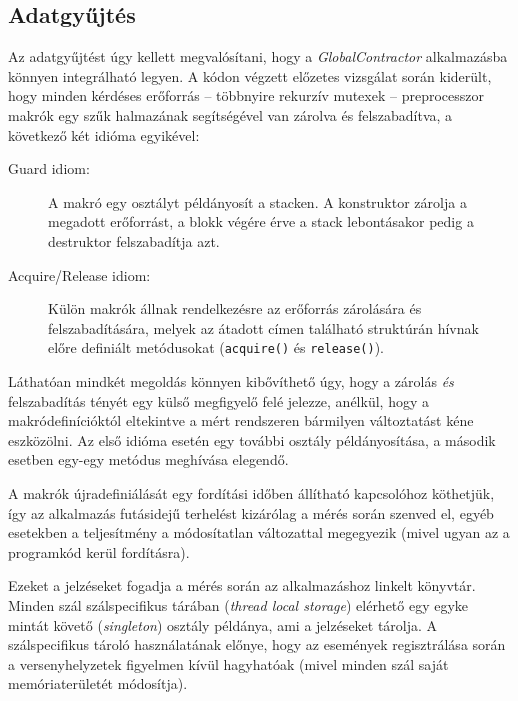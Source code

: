     \subsection{Adatgyűjtés}
    Az adatgyűjtést úgy kellett megvalósítani, hogy a \emph{GlobalContractor} alkalmazásba könnyen integrálható legyen. A kódon végzett előzetes vizsgálat során kiderült, hogy minden kérdéses erőforrás -- többnyire rekurzív mutexek -- preprocesszor makrók egy szűk halmazának segítségével van zárolva és felszabadítva, a következő két idióma egyikével:
    
    \begin{description}
        \item[Guard idiom:] A makró egy osztályt példányosít a stacken. A konstruktor zárolja a megadott erőforrást, a blokk végére érve a stack lebontásakor pedig a destruktor felszabadítja azt.
        \item[Acquire/Release idiom:] Külön makrók állnak rendelkezésre az erőforrás zárolására és felszabadítására, melyek az átadott címen található struktúrán hívnak előre definiált metódusokat (\texttt{acquire()} és \texttt{release()}).
    \end{description}
%    
    Láthatóan mindkét megoldás könnyen kibővíthető úgy, hogy a zárolás \emph{és} felszabadítás tényét egy külső megfigyelő felé jelezze, anélkül, hogy a makródefinícióktól eltekintve a mért rendszeren bármilyen változtatást kéne eszközölni. Az első idióma esetén egy további osztály példányosítása, a második esetben egy-egy metódus meghívása elegendő.
    
    A makrók újradefiniálását egy fordítási időben állítható kapcsolóhoz köthetjük, így az alkalmazás futásidejű terhelést kizárólag a mérés során szenved el, egyéb esetekben a teljesítmény a módosítatlan változattal megegyezik (mivel ugyan az a programkód kerül fordításra).

\medskip    
\lstset{
    basicstyle=\footnotesize\ttfamily
}    
    
\medskip

\noindent    
Ezeket a jelzéseket fogadja a mérés során az alkalmazáshoz linkelt könyvtár. Minden szál szálspecifikus tárában (\emph{thread local storage}) elérhető egy egyke mintát követő (\emph{singleton}) osztály példánya, ami a jelzéseket tárolja. A szálspecifikus tároló használatának előnye, hogy az események regisztrálása során a versenyhelyzetek figyelmen kívül hagyhatóak (mivel minden szál saját memóriaterületét módosítja).
    
